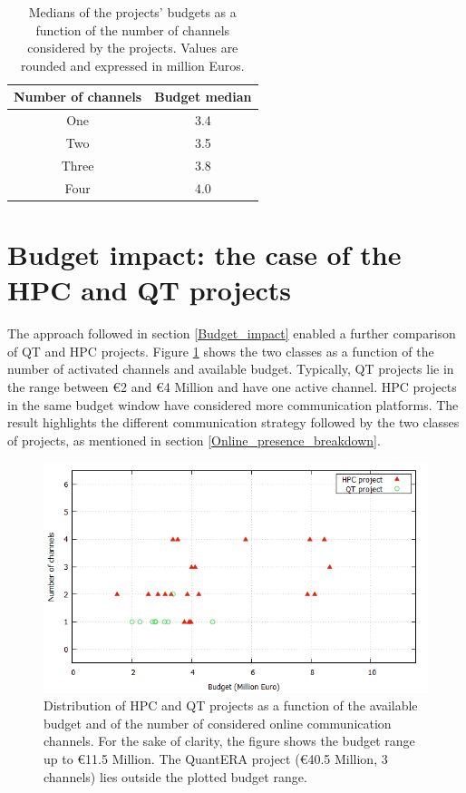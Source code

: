 \begin{table}[t]
 \begin{center}
  \begin{tabular}{cc}
   \hline 
   \hline
   Number of channels & Budget median \\ 
   \hline
   \hline
   One & 3.4 \\
   Two & 3.5 \\
   Three & 3.8 \\
   Four & 4.0 \\
   \hline
   \hline
  \end{tabular}
 \end{center} 
 \caption{Medians of the projects' budgets as a function of the number of channels considered by the projects. Values are rounded and expressed in million Euros.}
\label{Median} 
\end{table}

\section{Budget impact: the case of the HPC and QT projects} \label{Budget_impact_the_case_of_the_HPC_and_QT_projects}
The approach followed in section \ref{Budget_impact} enabled a further comparison of QT and HPC projects. Figure \ref{Channel_budget_breakdown} shows the two classes as a function of the number of activated channels and available budget. Typically, QT projects lie in the range between \euro 2 and \euro 4 Million and have one active channel. HPC projects in the same budget window have considered more communication platforms. The result highlights the different communication strategy followed by the two classes of projects, as mentioned in section \ref{Online_presence_breakdown}. 

\begin{figure}[!t] 
 \begin{center}
 \includegraphics[scale=0.4]{Images/Channel_budget_breakdown.png}
 \caption{Distribution of HPC and QT projects as a function of the available budget and of the number of considered online communication channels. For the sake of clarity, the figure shows the budget range up to \euro 11.5 Million. The QuantERA project (\euro 40.5 Million, 3 channels) lies outside the plotted budget range.}
 \label{Channel_budget_breakdown}
 \end{center}
\end{figure}

